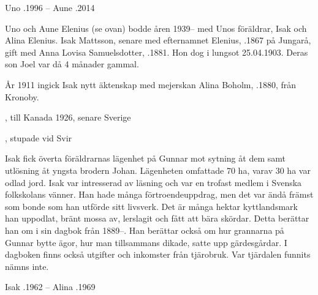 Uno .1996  --  Aune .2014


Uno och Aune Elenius (se ovan) bodde åren 1939-- med Unos föräldrar, Isak och Alina Elenius. Isak Mattsson, senare med efternamnet Elenius, .1867 på Jungarå, gift med Anna Lovisa Samuelsdotter, .1881. Hon dog i lungsot 25.04.1903. Deras son Joel var då 4 månader gammal.

År 1911 ingick Isak nytt äktenskap med mejerskan Alina Boholm, .1880, från Kronoby.
\begin{jhchildren}
  \item {}, till Kanada 1926, senare Sverige
  \item {}
  \item {}
  \item {}
  \item {}, stupade vid Svir
  \item {}
\end{jhchildren}
Isak fick överta föräldrarnas lägenhet på Gunnar mot sytning åt dem samt utlösning åt yngsta brodern Johan. Lägenheten omfattade 70 ha, varav 30 ha var odlad jord. Isak var intresserad av läsning och var en trofast medlem i Svenska folkskolans vänner. Han hade många förtroendeuppdrag, men det var ändå främst som bonde som han utförde sitt livsverk. Det är många hektar kyttlandsmark han uppodlat, bränt mossa av, lerslagit och fått att bära skördar. Detta berättar han om i sin dagbok från 1889--. Han berättar också om  hur grannarna på Gunnar bytte ägor, hur man tillsammans dikade, satte upp gärdesgårdar. I dagboken finns också utgifter och inkomster från tjärobruk. Var tjärdalen funnits nämns	inte.

Isak .1962  --  Alina .1969


